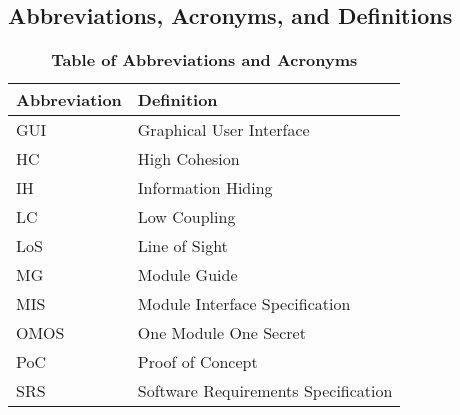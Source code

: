 \documentclass[12pt, titlepage]{article}
\begin{document}
    \subsection{Abbreviations, Acronyms, and Definitions}
        \begin{table}[H]
            \centering
            \caption{\textbf{Table of Abbreviations and Acronyms}}
            \label{TableAbbreviations}
            \bigskip
            \def\arraystretch{1.5}
            \begin{tabularx}{\textwidth}{p{3.7cm}X}
                \toprule
                \textbf{Abbreviation} & \textbf{Definition} \\
                \midrule
                GUI & Graphical User Interface\\
                HC & High Cohesion\\
                IH & Information Hiding\\
                LC & Low Coupling\\
                LoS & Line of Sight\\
                MG & Module Guide\\
                MIS & Module Interface Specification\\
                OMOS & One Module One Secret\\
                PoC & Proof of Concept\\
                SRS & Software Requirements Specification\\
            \bottomrule
            \end{tabularx}
        \end{table}
\end{document}
